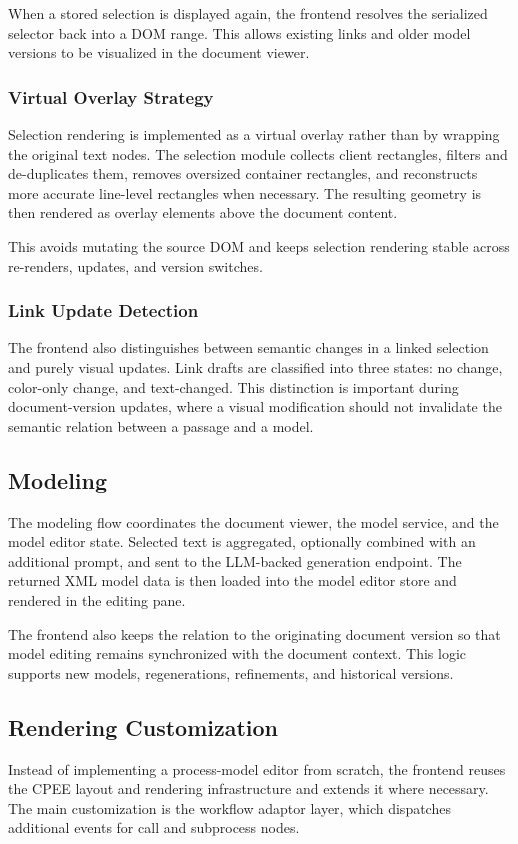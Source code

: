 When a stored selection is displayed again, the frontend resolves the serialized selector back into a DOM range. This allows existing links and older model versions to be visualized in the document viewer.

\subsubsection{Virtual Overlay Strategy}
Selection rendering is implemented as a virtual overlay rather than by wrapping the original text nodes. The selection module collects client rectangles, filters and de-duplicates them, removes oversized container rectangles, and reconstructs more accurate line-level rectangles when necessary. The resulting geometry is then rendered as overlay elements above the document content.

This avoids mutating the source DOM and keeps selection rendering stable across re-renders, updates, and version switches.

\subsubsection{Link Update Detection}
The frontend also distinguishes between semantic changes in a linked selection and purely visual updates. Link drafts are classified into three states: no change, color-only change, and text-changed. This distinction is important during document-version updates, where a visual modification should not invalidate the semantic relation between a passage and a model.

\subsection{Modeling}
The modeling flow coordinates the document viewer, the model service, and the model editor state. Selected text is aggregated, optionally combined with an additional prompt, and sent to the LLM-backed generation endpoint. The returned XML model data is then loaded into the model editor store and rendered in the editing pane.

The frontend also keeps the relation to the originating document version so that model editing remains synchronized with the document context. This logic supports new models, regenerations, refinements, and historical versions.

\subsection{Rendering Customization}
Instead of implementing a process-model editor from scratch, the frontend reuses the CPEE layout and rendering infrastructure and extends it where necessary. The main customization is the workflow adaptor layer, which dispatches additional events for call and subprocess nodes.


